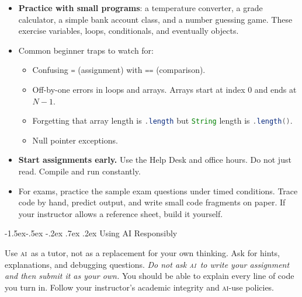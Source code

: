 \documentclass[12pt,twocolumn]{amsart}
\makeatletter
\newcommand{\AI}{\textsc{ai}}
\newcommand{\code}[1]{\lstinline[language=Java]{#1}}
\renewcommand\section{\@startsection{section}{1}%
  \z@
  {-1.5ex\@plus -.5ex \@minus -.2ex}%
  {.7ex \@plus .2ex}%
  {\normalfont\large\bfseries}}
\makeatother
\begin{document}
\begin{itemize}
	\item
	\textbf{Practice with small programs}: 
	a temperature converter, 
	a grade calculator, 
	a simple bank account class, and 
	a number guessing game. 
	These exercise variables, loops, conditionals, and eventually objects.
	
	\item
	Common beginner traps to watch for:
	
	\begin{itemize}
		
		\item 
		Confusing \code{=} (assignment) with \code{==} (comparison).
		
		\item 
		Off-by-one errors in loops and arrays. 
		Arrays start at index 0 and ends at $N - 1$.
		
		\item 
		Forgetting that array length is \code{.length} but 
		\code{String} length is \code{.length()}.
		
		\item 
		Null pointer exceptions.
	
		
	\end{itemize}

	\item
	\textbf{Start assignments early.} 
	Use the Help Desk and office hours. 
	Do not just read. Compile and run constantly.
	
	\item
	For exams, practice the sample exam questions under timed conditions. 
	Trace code by hand, predict output, and write small code fragments on paper. 
	If your instructor allows a reference sheet, build it yourself.

\end{itemize}




\section{Using AI Responsibly}

Use \AI\ as a tutor, not as a replacement for your own thinking. 
Ask for hints, explanations, and debugging questions. 
\emph{Do not ask \AI\ to write your assignment and then submit it as your own.} 
You should be able to explain every line of code you turn in. 
Follow your instructor’s academic integrity and \AI-use policies.




\end{document}
